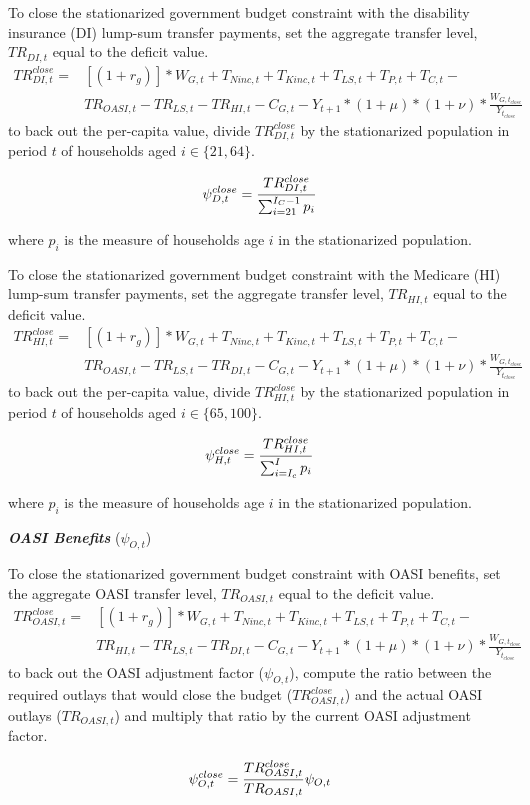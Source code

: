 \documentclass[11pt,leqno,fleqn]{article}
\newcommand{\be}{\vspace{-1em}\begin{singlespace}\begin{equation}}
\newcommand{\ee}{\end{equation}\end{singlespace}}
\begin{document}
To close the stationarized government budget constraint with the disability insurance (DI) lump-sum transfer payments, set the aggregate transfer level, $TR_{DI,t}$ equal to the deficit value.
\begin{align*}
TR_{DI,t}^{close} = &[(1+r_g)]*W_{G,t} + T_{Ninc,t} + T_{Kinc,t} + T_{LS,t} + T_{P,t} + T_{C,t} - \\
&TR_{OASI,t} - TR_{LS,t} - TR_{HI,t} - C_{G,t} - Y_{t+1}*(1+\mu)*(1+\nu)*\frac{W_{G,t_{close}}}{Y_{t_{close}}}
\end{align*}
to back out the per-capita value, divide $TR_{DI,t}^{close}$ by the stationarized population in period $t$ of households aged $i\in\{21,64\}$.
\be \psi_{D,t}^{close} = \frac{TR_{DI,t}^{close}}{\sum_{i=21}^{I_C-1} p_i} \notag \ee
where $p_i$ is the measure of households age $i$ in the stationarized population.

To close the stationarized government budget constraint with the Medicare (HI) lump-sum transfer payments, set the aggregate transfer level, $TR_{HI,t}$ equal to the deficit value.
\begin{align*}
TR_{HI,t}^{close} = &[(1+r_g)]*W_{G,t} + T_{Ninc,t} + T_{Kinc,t} + T_{LS,t} + T_{P,t} + T_{C,t} - \\
&TR_{OASI,t} - TR_{LS,t} - TR_{DI,t} - C_{G,t} - Y_{t+1}*(1+\mu)*(1+\nu)*\frac{W_{G,t_{close}}}{Y_{t_{close}}}
\end{align*}
to back out the per-capita value, divide $TR_{HI,t}^{close}$ by the stationarized population in period $t$ of households aged $i\in\{65,100\}$.
\be \psi_{H,t}^{close} = \frac{TR_{HI,t}^{close}}{\sum_{i=I_c}^{I} p_i} \notag \ee
where $p_i$ is the measure of households age $i$ in the stationarized population.

\begin{flushleft}
\textbf{\textit{OASI Benefits}} ($\psi_{O,t}$)
\end{flushleft}
To close the stationarized government budget constraint with OASI benefits, set the aggregate OASI transfer level, $TR_{OASI,t}$ equal to the deficit value.
\begin{align*}
TR_{OASI,t}^{close} = &[(1+r_g)]*W_{G,t} + T_{Ninc,t} + T_{Kinc,t} + T_{LS,t} + T_{P,t} + T_{C,t} -\\ 
&TR_{HI,t} - TR_{LS,t} - TR_{DI,t} - C_{G,t} - Y_{t+1}*(1+\mu)*(1+\nu)*\frac{W_{G,t_{close}}}{Y_{t_{close}}}
\end{align*}
to back out the OASI adjustment factor ($\psi_{O,t}$), compute the ratio between the required outlays that would close the budget ($TR_{OASI,t}^{close}$) and the actual OASI outlays ($TR_{OASI,t}$) and multiply that ratio by the current OASI adjustment factor.
\be \psi_{O,t}^{close} = \frac{TR_{OASI,t}^{close}}{TR_{OASI,t}}\psi_{O,t} \notag \ee
\end{document}
